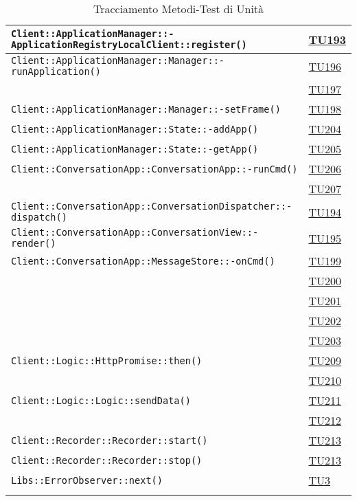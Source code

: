 \begin{longtable}{|>{\centering}m{12cm}|m{1cm}<{\centering}|}
\texttt{Client::ApplicationManager::-\linebreak ApplicationRegistryLocalClient::register()} & \hyperlink{TU193}{TU193}\\ \hline
\texttt{Client::ApplicationManager::Manager::-\linebreak runApplication()} & \hyperlink{TU196}{TU196}\\ & \hyperlink{TU197}{TU197}\\ \hline
\texttt{Client::ApplicationManager::Manager::-\linebreak setFrame()} & \hyperlink{TU198}{TU198}\\ \hline
\texttt{Client::ApplicationManager::State::-\linebreak addApp()} & \hyperlink{TU204}{TU204}\\ \hline
\texttt{Client::ApplicationManager::State::-\linebreak getApp()} & \hyperlink{TU205}{TU205}\\ \hline
\texttt{Client::ConversationApp::ConversationApp::-\linebreak runCmd()} & \hyperlink{TU206}{TU206}\\ & \hyperlink{TU207}{TU207}\\ \hline
\texttt{Client::ConversationApp::ConversationDispatcher::-\linebreak dispatch()} & \hyperlink{TU194}{TU194}\\ \hline
\texttt{Client::ConversationApp::ConversationView::-\linebreak render()} & \hyperlink{TU195}{TU195}\\ \hline
\texttt{Client::ConversationApp::MessageStore::-\linebreak onCmd()} & \hyperlink{TU199}{TU199}\\ & \hyperlink{TU200}{TU200}\\ & \hyperlink{TU201}{TU201}\\ & \hyperlink{TU202}{TU202}\\ & \hyperlink{TU203}{TU203}\\ \hline
\texttt{Client::Logic::HttpPromise::then()} & \hyperlink{TU209}{TU209}\\ & \hyperlink{TU210}{TU210}\\ \hline
\texttt{Client::Logic::Logic::sendData()} & \hyperlink{TU211}{TU211}\\ & \hyperlink{TU212}{TU212}\\ \hline
\texttt{Client::Recorder::Recorder::start()} & \hyperlink{TU213}{TU213}\\ \hline
\texttt{Client::Recorder::Recorder::stop()} & \hyperlink{TU213}{TU213}\\ \hline
\texttt{Libs::ErrorObserver::next()} & \hyperlink{TU3}{TU3}\\ \hline

\caption[Tracciamento Metodi-Test di Unità]{Tracciamento Metodi-Test di Unità}
\label{tabella:met-tu}
\end{longtable}
\clearpage

